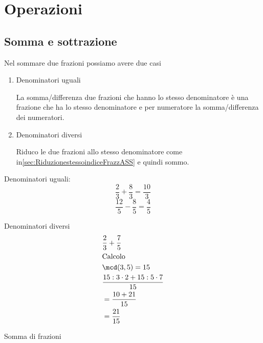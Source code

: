 \section{Operazioni}
	\label{sec:OperazioniASS}
	\subsection{Somma e sottrazione}
	\label{ssec:SommaesottrazioniASS}
	Nel sommare due frazioni possiamo avere due casi 
	\begin{enumerate}
		\item Denominatori uguali
		
		La somma/differenza due frazioni che hanno lo stesso denominatore è una frazione che ha lo stesso denominatore e per numeratore la somma/differenza dei numeratori. 
		\item Denominatori diversi
		
		Riduco le due frazioni allo stesso denominatore come in\nobs\vref{sec:RiduzionestessoindiceFrazzASS} e quindi sommo.
	\end{enumerate}
	\begin{esempio}
		Denominatori uguali:
		\[\dfrac{2}{3}+\dfrac{8}{3}=\dfrac{10}{3}\]  \[\dfrac{12}{5}-\dfrac{8}{5}=\dfrac{4}{5}\]
	\end{esempio}
	\begin{esempio}
		Denominatori diversi
		\begin{align*}
			&\dfrac{2}{3}+\dfrac{7}{5}\\
			&\text{Calcolo}\\
			&\mcd(3,5)=15\\
			&\dfrac{15:3\cdot 2+15:5\cdot 7}{15}\\
			&=\dfrac{10+21}{15}\\
			&=\dfrac{21}{15}
			\end{align*}
	\end{esempio}
	\begin{table}
		\centering
		
		\caption{Somma di frazioni}
		\label{tab:sommadifrazioniASS}
	\end{table}
